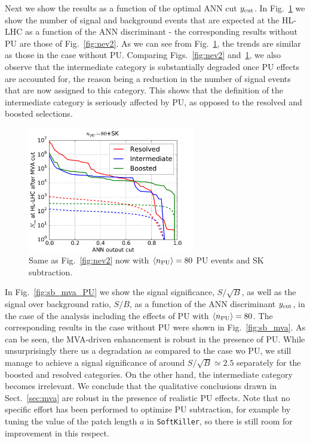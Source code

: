 Next we show the results
as a function of the optimal ANN cut $y_{\rm cut}$.
%
In Fig.~\ref{fig:nev2_PU}
we show the number of signal and background events that
are expected at the HL-LHC as a function of the ANN discriminant -
the corresponding results without PU are those of
Fig.~\ref{fig:nev2}.
%
As we can see from Fig.~\ref{fig:nev2_PU}, the trends are
similar as those in the case without PU.
%
Comparing Figs.~\ref{fig:nev2} and~\ref{fig:nev2_PU}, we also observe
that the intermediate category is substantially degraded once PU effects
are accounted for, the reason being a reduction in the number of signal
events that are now assigned to this category.
%
This shows that the definition of the intermediate category is seriously
affected by PU, as opposed to the resolved and boosted selections.

\begin{figure}[t]
\begin{center}
\includegraphics[width=0.65\textwidth]{plots/nev2_SKPU80.pdf}
\caption{\small Same as Fig.~\ref{fig:nev2} now
  with  $\left\langle n_{\rm PU}\right\rangle=80$ PU events 
  and SK subtraction.
}
\label{fig:nev2_PU}
\end{center}
\end{figure}


In Fig.~\ref{fig:sb_mva_PU} we show the signal significance,
$S/\sqrt{B}$, as well as the signal over background ratio,
$S/B$, as a function of the ANN discriminant $y_{\rm cut}$, in the case
of the analysis including the effects of PU
with $\left\langle n_{\rm PU}\right\rangle=80$.
%
The corresponding results in the case without PU were shown in
Fig.~\ref{fig:sb_mva}.
%
As can be seen, the MVA-driven enhancement is robust in the
presence of PU.
%
While unsurprisingly there us a degradation as compared to the case wo PU,
we still manage to achieve a signal significance of
around $S/\sqrt{B}\simeq 2.5$ separately for the boosted and resolved
categories.
%
On the other hand, the intermediate category becomes irrelevant.
%
We conclude that the qualitative conclusions drawn in
Sect.~\ref{sec:mva} are robust in the presence
of realistic PU effects.
%
Note that no specific effort has been performed to
optimize PU subtraction, for example by tuning the value
of the patch length $a$ in {\tt SoftKiller}, so there is
still room for improvement in this respect.


